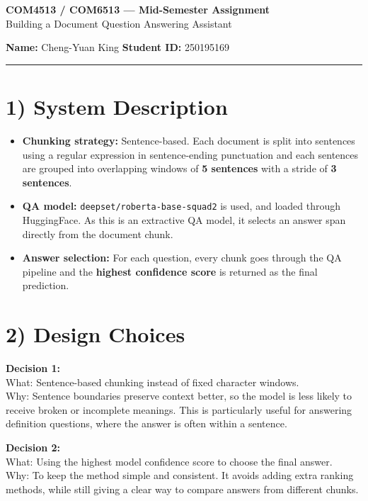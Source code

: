 \documentclass[10pt,a4paper]{article}
\begin{document}
\begin{center}
  {\large \textbf{COM4513 / COM6513 — Mid-Semester Assignment}} \\[4pt]
  {\normalsize Building a Document Question Answering Assistant}
\end{center}

\noindent
\textbf{Name:} Cheng-Yuan King \hfill \textbf{Student ID:} 250195169

\vspace{4pt}
\hrule
\vspace{6pt}

\section*{1) System Description}

\begin{itemize}
  \item \textbf{Chunking strategy:} Sentence-based. Each document is split into sentences using a regular expression in sentence-ending punctuation and each sentences are grouped into overlapping windows of \textbf{5 sentences} with a stride of \textbf{3 sentences}.
  \item \textbf{QA model:} \texttt{deepset/roberta-base-squad2} is used, and loaded through HuggingFace. As this is an extractive QA model, it selects an answer span directly from the document chunk.
  \item \textbf{Answer selection:} For each question, every chunk goes through the QA pipeline and the \textbf{highest confidence score} is returned as the final prediction.
\end{itemize}

\section*{2) Design Choices}

\noindent\textbf{Decision 1:}\\
{What:} Sentence-based chunking instead of fixed character windows.\\
{Why:} Sentence boundaries preserve context better, so the model is less likely to receive broken or incomplete meanings. This is particularly useful for answering definition questions, where the answer is often within a sentence.

\vspace{4pt}

\noindent\textbf{Decision 2:}\\
{What:} Using the highest model confidence score to choose the final answer.\\
{Why:} To keep the method simple and consistent. It avoids adding extra ranking methods, while still giving a clear way to compare answers from different chunks.
\end{document}
